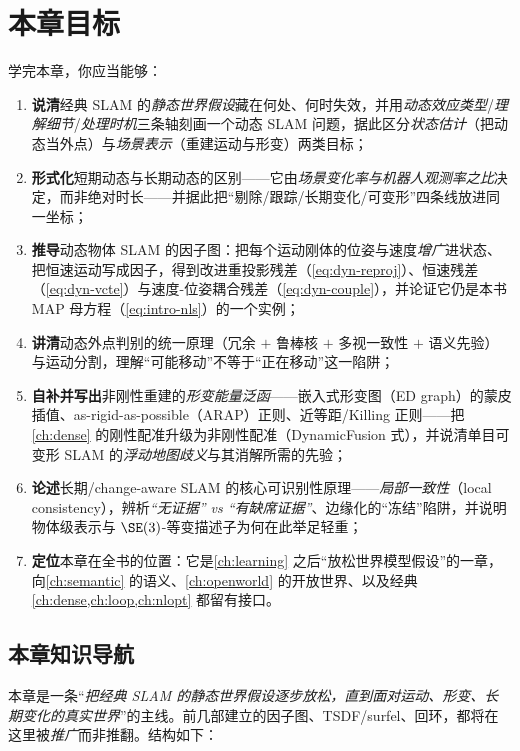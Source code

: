 \section*{本章目标}
学完本章，你应当能够：
\begin{enumerate}
  \item \textbf{说清}经典 SLAM 的\emph{静态世界假设}藏在何处、何时失效，并用\emph{动态效应类型}/\emph{理解细节}/\emph{处理时机}三条轴刻画一个动态 SLAM 问题，据此区分\emph{状态估计}（把动态当外点）与\emph{场景表示}（重建运动与形变）两类目标；
  \item \textbf{形式化}短期动态与长期动态的区别——它由\emph{场景变化率与机器人观测率之比}决定，而非绝对时长——并据此把“剔除/跟踪/长期变化/可变形”四条线放进同一坐标；
  \item \textbf{推导}动态物体 SLAM 的因子图：把每个运动刚体的位姿与速度\emph{增广}进状态、把恒速运动写成因子，得到改进重投影残差（\cref{eq:dyn-reproj}）、恒速残差（\cref{eq:dyn-vcte}）与速度-位姿耦合残差（\cref{eq:dyn-couple}），并论证它仍是本书 MAP 母方程（\cref{eq:intro-nls}）的一个实例；
  \item \textbf{讲清}动态外点判别的统一原理（冗余 $+$ 鲁棒核 $+$ 多视一致性 $+$ 语义先验）与运动分割，理解“可能移动”不等于“正在移动”这一陷阱；
  \item \textbf{自补并写出}非刚性重建的\emph{形变能量泛函}——嵌入式形变图（ED graph）的蒙皮插值、as-rigid-as-possible（ARAP）正则、近等距/Killing 正则——把 \cref{ch:dense} 的刚性配准升级为非刚性配准（DynamicFusion 式），并说清单目可变形 SLAM 的\emph{浮动地图歧义}与其消解所需的先验；
  \item \textbf{论述}长期/change-aware SLAM 的核心可识别性原理——\emph{局部一致性}（local consistency），辨析\emph{“无证据” vs “有缺席证据”}、边缘化的“冻结”陷阱，并说明物体级表示与 $\SE(3)$-等变描述子为何在此举足轻重；
  \item \textbf{定位}本章在全书的位置：它是\cref{ch:learning} 之后“放松世界模型假设”的一章，向\cref{ch:semantic} 的语义、\cref{ch:openworld} 的开放世界、以及经典 \cref{ch:dense,ch:loop,ch:nlopt} 都留有接口。
\end{enumerate}

\subsection*{本章知识导航}
本章是一条“\emph{把经典 SLAM 的静态世界假设逐步放松，直到面对运动、形变、长期变化的真实世界}”的主线。前几部建立的因子图、TSDF/surfel、回环，都将在这里被\emph{推广}而非推翻。结构如下：

